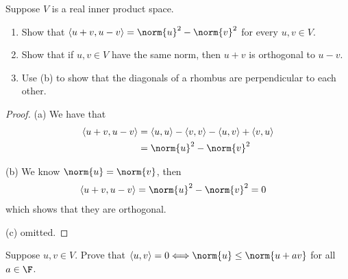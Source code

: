 \documentclass{extarticle}
\begin{document}
\begin{problem}{5}
    Suppose \(V\) is a real inner product space. 
    \begin{enumerate}[label=(\alph*)]
        \item Show that \(\langle u+v,u-v \rangle = \norm{u}^2 - \norm{v}^2\) for every \(u, v \in V\). 
        \item Show that if \(u, v \in V\) have the same norm, then \(u + v\) is orthogonal to \(u - v\). 
        \item Use (b) to show that the diagonals of a rhombus are perpendicular to each other.
    \end{enumerate}
\end{problem}

\begin{proof}
(a) We have that 
\begin{align*}
    \langle u + v,u - v \rangle 
    &= \langle u,u \rangle - \langle v,v \rangle - \langle u,v \rangle + \langle v,u \rangle \\ 
    &= \norm{u}^2 - \norm{v}^2
\end{align*}

(b) We know \(\norm{u} = \norm{v}\), then 
\begin{align*}
    \langle u+v,u-v \rangle 
    &= \norm{u}^2 - \norm{v}^2 = 0
\end{align*}
which shows that they are orthogonal. 

(c) omitted.
\end{proof}

\begin{problem}{6}
    Suppose \(u, v \in V\). Prove that \(\langle u,v \rangle = 0 \Longleftrightarrow \norm{u} \leq \norm{u 
    + av}\) for all \(a \in \F\).
\end{problem}
\end{document}
